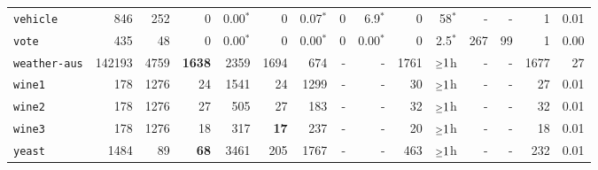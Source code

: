 \begin{tabular}{lccrrrrrrrrrrrr}
\texttt{vehicle} & \multicolumn{1}{r}{846} & \multicolumn{1}{r}{252}  & 0 & 0.00$^*$ & 0 & 0.07$^*$ & 0 & 6.9$^*$ & 0 & 58$^*$ & - & - & 1 & 0.01\\
\texttt{vote} & \multicolumn{1}{r}{435} & \multicolumn{1}{r}{48}  & 0 & 0.00$^*$ & 0 & 0.00$^*$ & 0 & 0.00$^*$ & 0 & 2.5$^*$ & 267 & 99 & 1 & 0.00\\
\texttt{weather-aus} & \multicolumn{1}{r}{142193} & \multicolumn{1}{r}{4759}  & \textbf{1638} & 2359 & 1694 & 674 & - & - & 1761 & $\mathsmaller{\geq}1$h & - & - & 1677 & 27\\
\texttt{wine1} & \multicolumn{1}{r}{178} & \multicolumn{1}{r}{1276}  & 24 & 1541 & 24 & 1299 & - & - & 30 & $\mathsmaller{\geq}1$h & - & - & 27 & 0.01\\
\texttt{wine2} & \multicolumn{1}{r}{178} & \multicolumn{1}{r}{1276}  & 27 & 505 & 27 & 183 & - & - & 32 & $\mathsmaller{\geq}1$h & - & - & 32 & 0.01\\
\texttt{wine3} & \multicolumn{1}{r}{178} & \multicolumn{1}{r}{1276}  & 18 & 317 & \textbf{17} & 237 & - & - & 20 & $\mathsmaller{\geq}1$h & - & - & 18 & 0.01\\
\texttt{yeast} & \multicolumn{1}{r}{1484} & \multicolumn{1}{r}{89}  & \textbf{68} & 3461 & 205 & 1767 & - & - & 463 & $\mathsmaller{\geq}1$h & - & - & 232 & 0.01\\
\bottomrule
\end{tabular}
